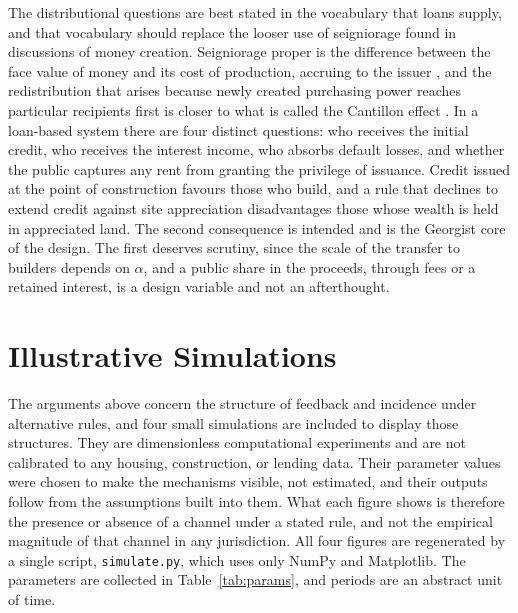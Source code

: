 \documentclass[11pt]{article}
\theoremstyle{definition}
\begin{document}
The distributional questions are best stated in the vocabulary that loans supply, and that vocabulary should replace the looser use of seigniorage found in discussions of money creation. Seigniorage proper is the difference between the face value of money and its cost of production, accruing to the issuer \cite{buiter2007}, and the redistribution that arises because newly created purchasing power reaches particular recipients first is closer to what is called the Cantillon effect \cite{cantillon1755}. In a loan-based system there are four distinct questions: who receives the initial credit, who receives the interest income, who absorbs default losses, and whether the public captures any rent from granting the privilege of issuance. Credit issued at the point of construction favours those who build, and a rule that declines to extend credit against site appreciation disadvantages those whose wealth is held in appreciated land. The second consequence is intended and is the Georgist core of the design. The first deserves scrutiny, since the scale of the transfer to builders depends on $\alpha$, and a public share in the proceeds, through fees or a retained interest, is a design variable and not an afterthought.

\section{Illustrative Simulations}
\label{sec:sims}

The arguments above concern the structure of feedback and incidence under alternative rules, and four small simulations are included to display those structures. They are dimensionless computational experiments and are not calibrated to any housing, construction, or lending data. Their parameter values were chosen to make the mechanisms visible, not estimated, and their outputs follow from the assumptions built into them. What each figure shows is therefore the presence or absence of a channel under a stated rule, and not the empirical magnitude of that channel in any jurisdiction. All four figures are regenerated by a single script, \texttt{simulate.py}, which uses only NumPy and Matplotlib. The parameters are collected in Table~\ref{tab:params}, and periods are an abstract unit of time.
\end{document}
